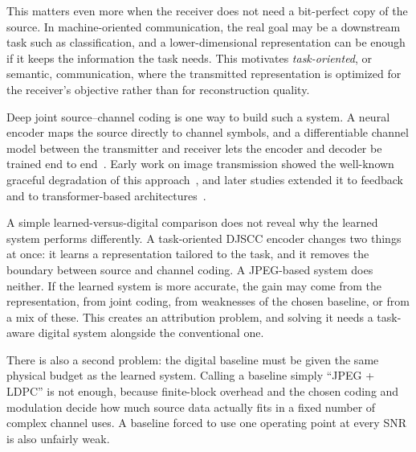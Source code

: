 \documentclass[conference]{IEEEtran}
\begin{document}
This matters even more when the receiver does not need a bit-perfect copy of the source. In machine-oriented communication, the real goal may be a downstream task such as classification, and a lower-dimensional representation can be enough if it keeps the information the task needs. This motivates \emph{task-oriented}, or semantic, communication, where the transmitted representation is optimized for the receiver's objective rather than for reconstruction quality.

Deep joint source--channel coding is one way to build such a system. A neural encoder maps the source directly to channel symbols, and a differentiable channel model between the transmitter and receiver lets the encoder and decoder be trained end to end~\cite{bourtsoulatze2019}. Early work on image transmission showed the well-known graceful degradation of this approach~\cite{bourtsoulatze2019}, and later studies extended it to feedback and to transformer-based architectures~\cite{kurka2020feedback,yang2023witt}.

A simple learned-versus-digital comparison does not reveal why the learned system performs differently. A task-oriented DJSCC encoder changes two things at once: it learns a representation tailored to the task, and it removes the boundary between source and channel coding. A JPEG-based system does neither. If the learned system is more accurate, the gain may come from the representation, from joint coding, from weaknesses of the chosen baseline, or from a mix of these. This creates an attribution problem, and solving it needs a task-aware digital system alongside the conventional one.

There is also a second problem: the digital baseline must be given the same physical budget as the learned system. Calling a baseline simply ``JPEG + LDPC'' is not enough, because finite-block overhead and the chosen coding and modulation decide how much source data actually fits in a fixed number of complex channel uses. A baseline forced to use one operating point at every SNR is also unfairly weak.
\end{document}
